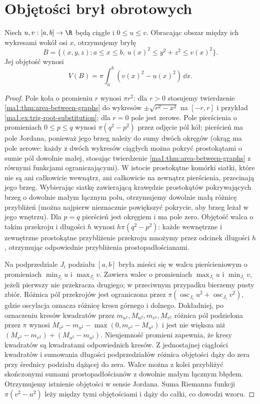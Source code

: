 \section{Objętości brył obrotowych}
\begin{twierdzenie}
\label{ma1:thm:rotation-volume}
Niech $u,v:[a,b]\to\R$ będą ciągłe i $0\le u\le v$. Obracając obszar między ich wykresami wokół osi $x$, otrzymujemy bryłę
\[
 B=\{(x,y,z):a\le x\le b,\ u(x)^2\le y^2+z^2\le v(x)^2\}.
\]
Jej objętość wynosi
\[
 V(B)=\pi\int_a^b(v(x)^2-u(x)^2)\,\dd x.
\]
\end{twierdzenie}
\begin{proof}
Pole koła o promieniu $r$ wynosi $\pi r^2$: dla $r>0$ stosujemy twierdzenie \ref{ma1:thm:area-between-graphs} do wykresów $\pm\sqrt{r^2-x^2}$ na $[-r,r]$ i przykład \ref{ma1:ex:trig-root-substitution}; dla $r=0$ pole jest zerowe. Pole pierścienia o promieniach $0\le p\le q$ wynosi $\pi(q^2-p^2)$ przez odjęcie pól kół; pierścień ma pole Jordana, ponieważ jego brzeg należy do sumy dwóch okręgów (okrąg ma pole zerowe: każdy z dwóch wykresów ciągłych można pokryć prostokątami o sumie pól dowolnie małej, stosując twierdzenie \ref{ma1:thm:area-between-graphs} z równymi funkcjami ograniczającymi). W istocie prostokątne komórki siatki, które nie są ani całkowicie wewnątrz, ani całkowicie na zewnątrz pierścienia, przecinają jego brzeg. Wybierając siatkę zawierającą krawędzie prostokątów pokrywających brzeg o dowolnie małym łącznym polu, otrzymujemy dowolnie małą różnicę przybliżeń (można najpierw nieznacznie powiększyć pokrycie, aby brzeg leżał w jego wnętrzu). Dla $p=q$ pierścień jest okręgiem i ma pole zero. Objętość walca o takim przekroju i długości $h$ wynosi $h\pi(q^2-p^2)$: każde wewnętrzne i zewnętrzne prostokątne przybliżenie przekroju mnożymy przez odcinek długości $h$, otrzymując odpowiednie przybliżenia prostopadłościanami.

Na podprzedziale $J_i$ podziału $[a,b]$ bryła mieści się w walcu pierścieniowym o promieniach $\min_{J_i}u$ i $\max_{J_i}v$. Zawiera walec o promieniach $\max_{J_i}u$ i $\min_{J_i}v$, jeżeli pierwszy nie przekracza drugiego; w przeciwnym przypadku bierzemy pusty zbiór. Różnica pól przekrojów jest ograniczona przez $\pi(\operatorname{osc}_{J_i}u^2+\operatorname{osc}_{J_i}v^2)$, gdzie oscylacja oznacza różnicę kresu górnego i dolnego. Dokładniej, po oznaczeniu kresów kwadratów przez $m_{u^2},M_{u^2},m_{v^2},M_{v^2}$ różnica pól podzielona przez $\pi$ wynosi $M_{v^2}-m_{u^2}-\max(0,m_{v^2}-M_{u^2})$ i jest nie większa niż $(M_{v^2}-m_{v^2})+(M_{u^2}-m_{u^2})$. Nieujemność promieni zapewnia, że kresy kwadratów są kwadratami odpowiednich kresów. Z jednostajnej ciągłości kwadratów i sumowania długości podprzedziałów różnica objętości dąży do zera przy średnicy podziału dążącej do zera. Walce można z kolei przybliżyć skończonymi sumami prostopadłościanów z dowolnie małym łącznym błędem. Otrzymujemy istnienie objętości w sensie Jordana. Suma Riemanna funkcji $\pi(v^2-u^2)$ leży między tymi objętościami i dąży do całki, co dowodzi wzoru.
\end{proof}
